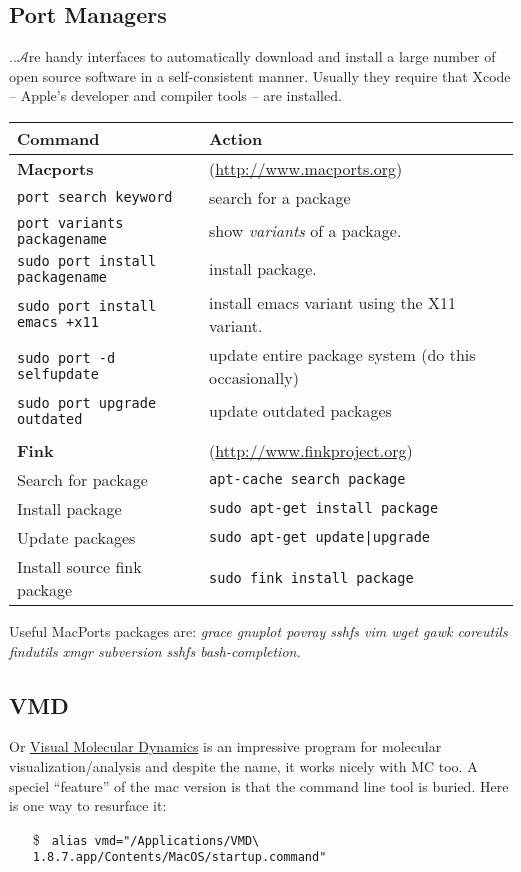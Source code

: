 \documentclass[a4paper,10pt]{article}
\begin{document}
\subsection{\label{sec:ports}Port Managers}
..$\mathcal{A}$re handy interfaces to automatically download and install a large number of open source software in a self-consistent manner. Usually they require that Xcode -- Apple's developer and compiler tools -- are installed.
\begin{table}[h!]
\center
\begin{small}
\begin{tabular}{ll}\hline\hline
Command              & Action \\\hline
\textbf{Macports}    & (\url{http://www.macports.org})\\
\verb"port search keyword" & search for a package\\
\verb+port variants packagename+ & show \emph{variants} of a package.\\
\verb"sudo port install packagename" & install package.\\
\verb"sudo port install emacs +x11" & install emacs variant using the X11 variant.\\
\verb"sudo port -d selfupdate" & update entire package system (do this occasionally)\\
\verb"sudo port upgrade outdated" & update outdated packages\\
\\
\textbf{Fink}       & (\url{http://www.finkproject.org})\\
Search for package  & \verb"apt-cache search package"\\
Install package     & \verb"sudo apt-get install package"\\
Update packages     &  \verb"sudo apt-get update|upgrade"\\
Install source fink package & \verb"sudo fink install package"\\\hline
\end{tabular}\end{small}\end{table}

Useful MacPorts packages are: \emph{grace gnuplot povray sshfs vim wget gawk coreutils findutils xmgr subversion sshfs bash-completion.}


\subsection{VMD}
Or \href{http://www.google.com/search?q=vmd}{Visual Molecular Dynamics} is an impressive program for molecular visualization/analysis and despite the name, it works nicely with MC too. A speciel ``feature'' of the mac version is that the command line tool is buried. Here is one way to resurface it:
\begin{itemize}
\item[\$] \verb+ alias vmd="/Applications/VMD\ 1.8.7.app/Contents/MacOS/startup.command"+
\end{itemize}
\end{document}
